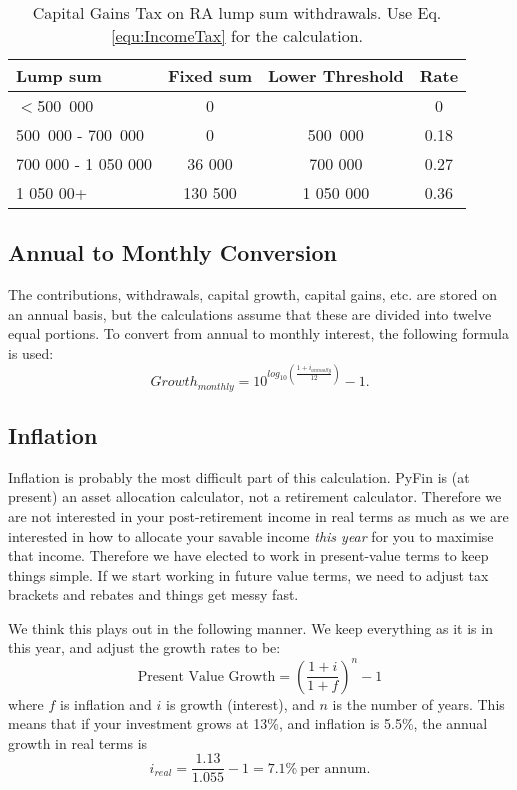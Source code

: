 \documentclass[a4paper, justified]{tufte-handout}
\begin{document}
\begin{table}[]
	\centering
	\caption{Capital Gains Tax on RA lump sum withdrawals. Use Eq.\ref{equ:IncomeTax} for the calculation.}
	\label{tab:CGTRA}
	\begin{tabular}{lccc}
		\toprule
		\textbf{Lump sum}  & \textbf{Fixed sum} & \textbf{Lower Threshold} & \textbf{Rate} \\
		\midrule
		$<$500~000            & 0         &          & 0 \\
		500~000 - 700~000  & 0    & 500~000         & 0.18 \\
		700 000 - 1 050 000  & 36 000   & 700 000          & 0.27  \\
		1 050 00+  & 130 500   & 1 050 000      & 0.36  \\
		\bottomrule
	\end{tabular}
\end{table}

\subsection{Annual to Monthly Conversion}
The contributions, withdrawals, capital growth, capital gains, etc. are stored on an annual basis, but the calculations assume that these are divided into twelve equal portions. To convert from annual to monthly interest, the following formula is used:
\begin{equation}
Growth_{monthly} = 10^{log_{10}\left(\frac{1 +i_{annually}}{12}\right)} - 1.
\end{equation}

\subsection{Inflation}
Inflation is probably the most difficult part of this calculation. PyFin is (at present) an asset allocation calculator, not a retirement calculator. Therefore we are not interested in your post-retirement income in real terms as much as we are interested in how to allocate your savable income \textit{this year} for you to maximise that income. Therefore we have elected to work in present-value terms to keep things simple. If we start working in future value terms, we need to adjust tax brackets and rebates and things get messy fast.

We think this plays out in the following manner. We keep everything as it is in this year, and adjust the growth rates to be:
\begin{equation}
\textrm{Present Value Growth} = \left(\frac{1+i}{1+f}\right)^n - 1
\end{equation}
where $f$ is inflation and $i$ is growth (interest), and $n$ is the number of years. This means that if your investment grows at 13\%, and inflation is 5.5\%, the annual growth in real terms is 
\begin{equation}
i_{real} = \frac{1.13}{1.055} - 1=7.1\%~\textrm{per annum.}
\end{equation}
\end{document}
